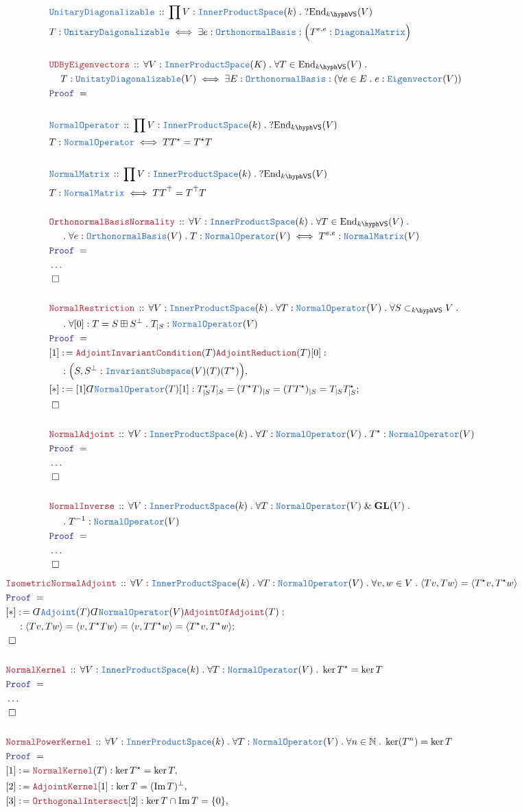\documentclass[12pt]{scrartcl}%
\newcommand{\TYPE}[1]{\textcolor{NavyBlue}{\mathtt{#1}}}%
\newcommand{\LOGIC}[1]{\textcolor{Blue}{\mathtt{#1}}}%
\newcommand{\THM}[1]{\textcolor{Maroon}{\mathtt{#1}}}%
\renewcommand{\.}{\; . \;} %
\newcommand{\de}{: \kern 0.1pc =} %
\newcommand{\Theorem}[2]{& \THM{#1} \, :: \, #2 \\ & \Proof = \\ } %
\newcommand{\DeclareType}[2]{& \TYPE{#1} \, :: \, #2 \\}%
\newcommand{\DefineType}[3]{& #1 : \TYPE{#2} \iff #3 \\}%
\newcommand{\NewLine}{\\ & \kern 1pc}%
\newcommand{\Page}[1]{ \begin{align*} #1 \end{align*}  }%
\newcommand{ \bd }{ \ByDef }%
\newcommand{\NoProof}{ & \ldots \\ \EndProof}%
\renewcommand{\And}{\; \& \;}%
\newcommand{\Nat}{\mathbb{N}}%
\DeclareMathOperator*{\im}{Im}%
\newcommand{\End}{\mathrm{End}}%
\newcommand{\Say}[3]{& #1 \de #2 : #3, \\} %
\newcommand{\Conclude}[3]{& #1 \de #2 : #3; \\}%
\newcommand{\QED}{\; \square} %
\newcommand{\EndProof}{& \QED \\} %
\newcommand{\ByDef}{\rotatebox[origin=c]{-180}{$D$}}%
\newcommand{\Proof}{\LOGIC{Proof} \; } %
\newcommand{\subvec}[1]{\subset_{\VS{#1}}}%
\newcommand{\Diag}{\TYPE{DiagonalMatrix}}
\newcommand{\GL}{\mathbf{GL}}%
\newcommand{\IS}{\TYPE{InvariantSubspace}}
\newcommand{\IPS}{\TYPE{InnerProductSpace}}
\newcommand{\OBasis}{\TYPE{OrthonormalBasis}}
\newcommand{\NO}{\TYPE{NormalOperator}}
\newcommand{\NM}{\TYPE{NormalMatrix}}
\newcommand{\VS}[1]{#1\hyph\mathsf{VS}} %
\begin{document}
\Page{
	\DeclareType{UnitaryDiagonalizable}{ \prod V : \IPS(k) \.  ?\End_{\VS{k}}(V)  }
	\DefineType{T}{UnitaryDaigonalizable}{\exists e : \OBasis :\Big(T^{e,e} : \Diag\Big)}
	\\
	\Theorem{UDByEigenvectors}{\forall V : \IPS(K) \. \forall T \in \End_{\VS{k}}(V) \. 
	\NewLine T : \TYPE{UnitatyDiagonalizable}(V) \iff \exists E : \OBasis : (\forall e \in E \. e : \TYPE{Eigenvector}(V)) }
	\\
	\DeclareType{\NO}{ \prod V : \IPS(k) \. ?\End_{\VS{k}}(V) }
	\DefineType{T}{  \NO  }{TT^\star = T^\star T}
	\\
	\DeclareType{\NM}{ \prod V : \IPS(k) \. ?\End_{\VS{k}}(V) }
	\DefineType{T}{  \NM  }{TT^{\bar \top} = T^{\bar \top} T}
	\\
	\Theorem{OrthonormalBasisNormality}{\forall V :\IPS(k) \. \forall T \in \End_{\VS{k}}(V) \. \NewLine \. \forall e : \OBasis(V) \. T : \NO(V) \iff T^{e,e} : \NM(V) }
	\NoProof
	\\
	\Theorem{NormalRestriction}{\forall V : \IPS(k) \. \forall T : \NO(V) \. \forall S \subvec{k} V \.  \NewLine \. \forall [0] : T = S \boxplus S^\bot \. T_{|S} : \NO(V)}
	\Say{[1]}{\THM{AdjointInvariantCondition}(T)\THM{AdjointReduction}(T)[0]}{ \NewLine : \Big( S,S^\bot : \IS(V)(T)(T^\star) \Big) }
	\Conclude{[*]}{[1]\bd \NO(T)[1]}{ T^\star_{|S} T_{|S} = (T^\star T)_{|S} = (TT^\star)_{|S} =T_{|S}T^\star_{|S}}
	\EndProof
	\\
	\Theorem{NormalAdjoint}{\forall V : \IPS(k) \. \forall T : \NO(V) \.  T^\star : \NO(V) }
	\NoProof
	\\
	\Theorem{NormalInverse}{\forall V : \IPS(k) \. \forall T : \NO(V) \And \GL(V) \.  \NewLine \. T^{-1} : \NO(V) }
	\NoProof
}\Page{
	\Theorem{IsometricNormalAdjoint}{\forall V : \IPS(k) \. \forall T : \NO(V) \. \forall v,w \in V \. \langle Tv, Tw \rangle = \langle T^\star v, T^\star w \rangle}
	\Conclude{[*]}{\bd \TYPE{Adjoint}(T)\bd \NO(V)\THM{AdjointOfAdjoint}(T)}{ 
		\NewLine :
		\langle Tv, Tw \rangle = \langle v, T^\star Tw \rangle = \langle v, T T^\star w \rangle =  \langle T^\star v, T^\star w \rangle}
	\EndProof
	\\
	\Theorem{NormalKernel}{\forall V : \IPS(k) \. \forall T : \NO(V) \. \ker T^\star = \ker T}
	\NoProof
	\\
	\Theorem{NormalPowerKernel}{\forall V : \IPS(k) \. \forall T : \NO(V) \. \forall n \in \Nat \. \ker(T^n) = \ker T}
	\Say{[1]}{\THM{NormalKernel}(T)}{\ker T^\star = \ker T}
	\Say{[2]}{\THM{AdjointKernel}[1]}{ \ker T = (\im T)^\bot}
	\Say{[3]}{\THM{OrthogonalIntersect}[2]}{ \ker T \cap \im T = \{0\} }
}
\end{document}
